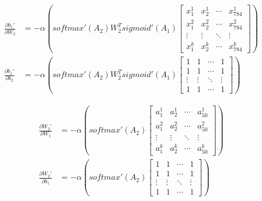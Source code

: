\documentclass[12pt,a4paper]{amsart}
\begin{document}
\begin{equation}
	\begin{aligned}
		\frac{\partial {b_1}'}{\partial W_2} & = - \alpha \left( softmax'(A_2) W_2^T sigmoid'(A_1) \begin{bmatrix}
			x_1^1  & x_2^1  & \cdots & x_{784}^1 \\
			x_1^2  & x_2^2  & \cdots & x_{784}^2 \\
			\vdots & \vdots & \ddots & \vdots    \\
			x_1^k  & x_2^k  & \cdots & x_{784}^k
		\end{bmatrix} \right) \\
		\frac{\partial {b_1}'}{\partial b_2} & = - \alpha \left( softmax'(A_2) W_2^T sigmoid'(A_1) \begin{bmatrix}
			1      & 1      & \cdots & 1      \\
			1      & 1      & \cdots & 1      \\
			\vdots & \vdots & \ddots & \vdots \\
			1      & 1      & \cdots & 1
		\end{bmatrix} \right)
	\end{aligned}
\end{equation}

\begin{equation}
	\begin{aligned}
		\frac{\partial {W_2}'}{\partial W_1} & = - \alpha \left( softmax'(A_2) \begin{bmatrix}
			a_1^1  & a_2^1  & \cdots & a_{50}^1 \\
			a_1^2  & a_2^2  & \cdots & a_{50}^2 \\
			\vdots & \vdots & \ddots & \vdots   \\
			a_1^k  & a_2^k  & \cdots & a_{50}^k
		\end{bmatrix} \right) \\
		\frac{\partial {W_2}'}{\partial b_1} & = - \alpha \left( softmax'(A_2) \begin{bmatrix}
			1      & 1      & \cdots & 1      \\
			1      & 1      & \cdots & 1      \\
			\vdots & \vdots & \ddots & \vdots \\
			1      & 1      & \cdots & 1
		\end{bmatrix} \right)
	\end{aligned}
\end{equation}
\end{document}
